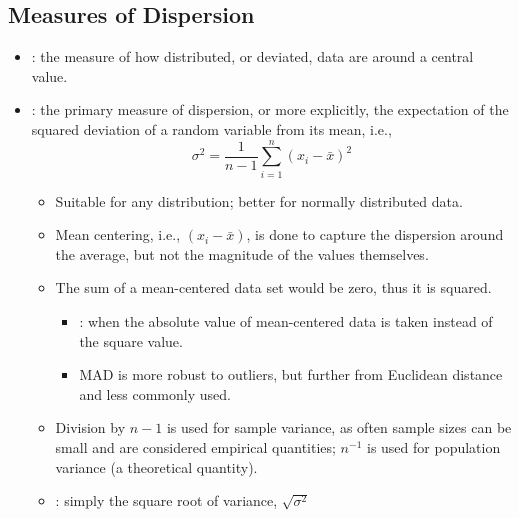 \begin{itemize}
  \subsection{Measures of Dispersion}
  \begin{itemize}
    \item {}: the measure of how distributed, or deviated, data are around a central value.
    \item {}: the primary measure of dispersion, or more explicitly, the expectation of the squared deviation of a random variable from its mean, i.e.,
    \[%
    \sigma^2 = \frac{1}{n-1}\sum_{i = 1}^{n}(x_i-\bar{x})^2
    \]%
    \begin{itemize}
      \item Suitable for any distribution; better for normally distributed data.
      \item Mean centering, i.e., \((x_i - \bar{x})\), is done to capture the dispersion around the average, but not the magnitude of the values themselves.
      \item The sum of a mean-centered data set would be zero, thus it is squared.
        \begin{itemize}
          \item {}: when the absolute value of mean-centered data is taken instead of the square value. 
          \item MAD is more robust to outliers, but further from Euclidean distance and less commonly used. 
        \end{itemize}
      \item Division by \(n-1\) is used for sample variance, as often sample sizes can be small and are considered empirical quantities; \(n ^{-1}\) is used for population variance (a theoretical quantity).
      \item {}: simply the square root of variance, \(\sqrt{\sigma^2}\)
    \end{itemize}
  \end{itemize}


\end{itemize}
